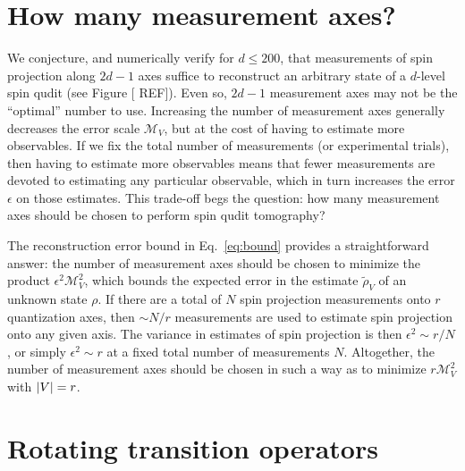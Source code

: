 \documentclass[notitlepage,twocolumn]{revtex4-2}
\newcommand{\1}{\mathds{1}}
\newcommand{\M}{\mathcal{M}}
\newcommand{\red}[1]{{\color{red} #1}}
\begin{document}
\section{How many measurement axes?}
\label{sec:axes}

We conjecture, and numerically verify for $d\le200$, that measurements of spin projection along $2d-1$ axes suffice to reconstruct an arbitrary state of a $d$-level spin qudit (see Figure [\red{REF}]).
Even so, $2d-1$ measurement axes may not be the ``optimal'' number to use.
Increasing the number of measurement axes generally decreases the error scale $\M_V$, but at the cost of having to estimate more observables.
If we fix the total number of measurements (or experimental trials), then having to estimate more observables means that fewer measurements are devoted to estimating any particular observable, which in turn increases the error $\epsilon$ on those estimates.
This trade-off begs the question: how many measurement axes should be chosen to perform spin qudit tomography?

The reconstruction error bound in Eq.~\eqref{eq:bound} provides a straightforward answer: the number of measurement axes should be chosen to minimize the product $\epsilon^2\M_V^2$, which bounds the expected error in the estimate $\tilde\rho_V$ of an unknown state $\rho$.
If there are a total of $N$ spin projection measurements onto $r$ quantization axes, then $\sim N/r$ measurements are used to estimate spin projection onto any given axis.
The variance in estimates of spin projection is then $\epsilon^2\sim r/N$, or simply $\epsilon^2\sim r$ at a fixed total number of measurements $N$.
Altogether, the number of measurement axes should be chosen in such a way as to minimize $r\M_V^2$ with $\abs{V}=r$.







\onecolumngrid
\appendix

\section{Rotating transition operators}
\label{sec:rotations}
\end{document}
